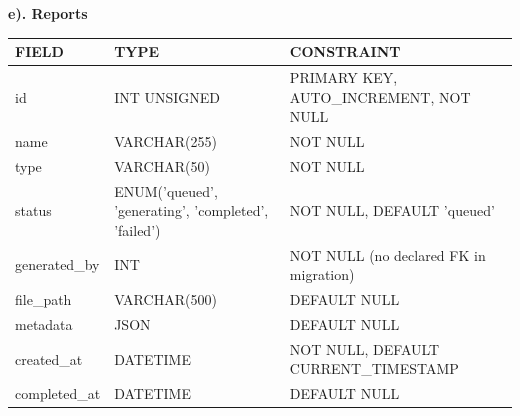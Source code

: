 \clearpage
\noindent\textbf{e). Reports}
\vspace{0.2cm}
\begin{center}
    \renewcommand{\arraystretch}{1.3}
    \begin{tabular}{|>{\raggedright\arraybackslash}p{3.0cm}|>{\raggedright\arraybackslash}p{4.5cm}|>{\raggedright\arraybackslash}p{8.5cm}|}
        \hline
        \rowcolor{lightgray!50}
        \textbf{FIELD} & \textbf{TYPE}                                       & \textbf{CONSTRAINT}                    \\ \hline
        id             & INT UNSIGNED                                        & PRIMARY KEY, AUTO\_INCREMENT, NOT NULL \\ \hline
        name           & VARCHAR(255)                                        & NOT NULL                               \\ \hline
        type           & VARCHAR(50)                                         & NOT NULL                               \\ \hline
        status         & ENUM('queued', 'generating', 'completed', 'failed') & NOT NULL, DEFAULT 'queued'             \\ \hline
        generated\_by  & INT                                                 & NOT NULL (no declared FK in migration) \\ \hline
        file\_path     & VARCHAR(500)                                        & DEFAULT NULL                           \\ \hline
        metadata       & JSON                                                & DEFAULT NULL                           \\ \hline
        created\_at    & DATETIME                                            & NOT NULL, DEFAULT CURRENT\_TIMESTAMP   \\ \hline
        completed\_at  & DATETIME                                            & DEFAULT NULL                           \\ \hline
    \end{tabular}
\end{center}


